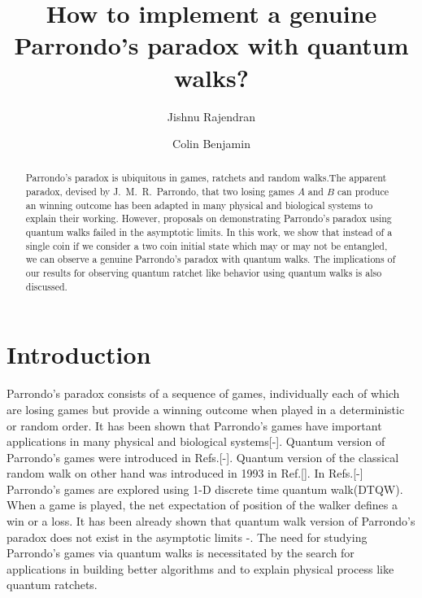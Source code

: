 \documentclass[english,aps,pra,amsmath,amssymb,showpacs,notitlepage,onecolumn]{revtex4-1}
\begin{document}
\title{How to implement a genuine Parrondo's paradox with quantum walks?}
\author{Jishnu Rajendran}
\author{Colin Benjamin}
\begin{abstract}
Parrondo's paradox is ubiquitous in games, ratchets and random walks.The apparent paradox, devised by J.~M.~R.~Parrondo, that two losing games $A$ and $B$ can produce an winning outcome has been adapted in many physical and biological systems to explain their working. However, proposals on demonstrating Parrondo's paradox using quantum walks failed in the asymptotic limits. In this work, we show that instead of a single coin if we consider a two coin initial state which may or may not be entangled, we can observe a genuine Parrondo's paradox with quantum walks. The implications of our results for observing quantum ratchet like behavior using quantum walks is also discussed.   
\end{abstract}
\maketitle
\section{Introduction}
Parrondo's paradox consists of a sequence of games, individually each of which are losing games but provide a winning outcome when played in a deterministic or random order. It has been shown that Parrondo's games have important applications in many physical and biological systems[-]. Quantum version of Parrondo's games were introduced in Refs.[-]. Quantum version of the classical random walk on other hand was introduced in 1993 in Ref.[]. In Refs.[-] Parrondo's games are explored using 1-D discrete time quantum walk(DTQW). When a game is played, the net expectation of position of the walker defines a win or a loss. It has been already shown that quantum walk version of Parrondo's paradox does not exist in the asymptotic limits \cite{flitney}-\cite{minli}. The need for studying Parrondo's games via quantum walks is necessitated by the search for applications in building better algorithms\cite{ken} and to explain physical process like quantum ratchets\cite{chandru2}.
\end{document}
